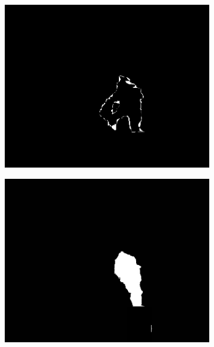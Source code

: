 \documentclass[t]{beamer}
\begin{document}
\begin{frame}
\begin{figure}[h!]
			\begin{subfigure}{.30\textwidth}
				\centering
				\includegraphics[width = \textwidth]{image/examples/mask_dif/206}
			\end{subfigure}
			\hspace*{0.00cm}
			\begin{subfigure}{.30\textwidth}
				\centering
				\includegraphics[width = \textwidth]{image/examples/mask/240}
				\caption{}
			\end{subfigure}
			\begin{subfigure}{.30\textwidth}

\end{subfigure}
\end{figure}
\end{frame}
\end{document}

